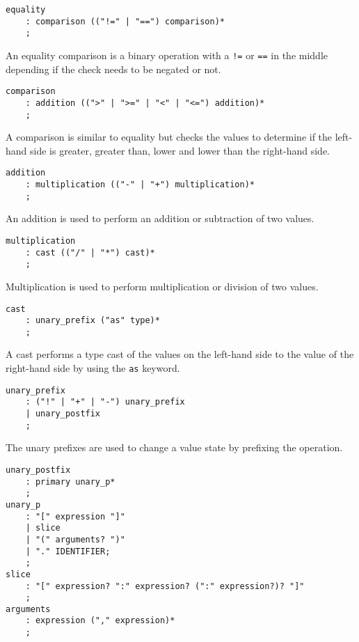 \begin{lstlisting}
equality
    : comparison (("!=" | "==") comparison)*
    ;
\end{lstlisting}

An equality comparison is a binary operation with a \texttt{!=} or \texttt{==} in the middle depending if the check needs to be negated or not.

\begin{lstlisting}
comparison
    : addition ((">" | ">=" | "<" | "<=") addition)*
    ;
\end{lstlisting}

A comparison is similar to equality but checks the values to determine if the left-hand side is greater, greater than, lower and lower than the
right-hand side.

\begin{lstlisting}
addition
    : multiplication (("-" | "+") multiplication)*
    ;
\end{lstlisting}

An addition is used to perform an addition or subtraction of two values.

\begin{lstlisting}
multiplication
    : cast (("/" | "*") cast)*
    ;
\end{lstlisting}

Multiplication is used to perform multiplication or division of two values.

\begin{lstlisting}
cast
    : unary_prefix ("as" type)*
    ;
\end{lstlisting}

A cast performs a type cast of the values on the left-hand side to the value of the right-hand side by using the \texttt{as} keyword.

\begin{lstlisting}
unary_prefix
    : ("!" | "+" | "-") unary_prefix
    | unary_postfix
    ;
\end{lstlisting}

The unary prefixes are used to change a value state by prefixing the operation.

\begin{lstlisting}
unary_postfix
    : primary unary_p*
    ;
unary_p
    : "[" expression "]"
    | slice
    | "(" arguments? ")"
    | "." IDENTIFIER;
    ;
slice
    : "[" expression? ":" expression? (":" expression?)? "]"
    ;
arguments
    : expression ("," expression)*
    ;
\end{lstlisting}

